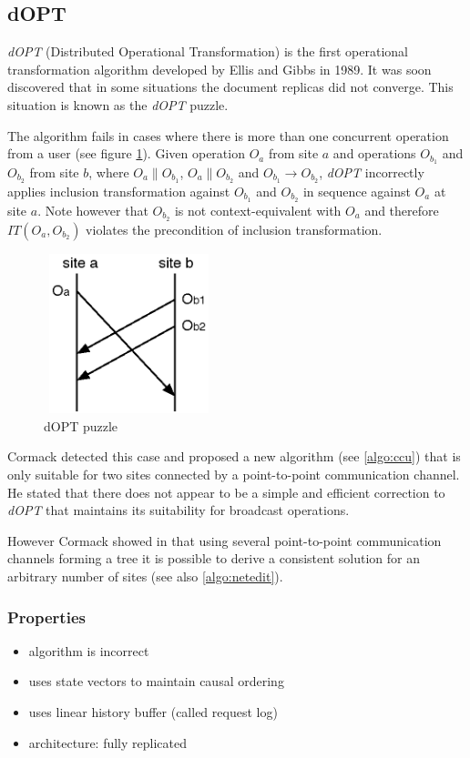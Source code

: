 \subsection{dOPT}
\label{algo:dopt}

\emph{dOPT} (Distributed Operational Transformation) is the first operational transformation algorithm developed by {Ellis and Gibbs}\cite{ellis} in 1989. It was soon discovered that in some situations the document replicas did not converge. This situation is known as the \emph{dOPT} puzzle.

The algorithm fails in cases where there is more than one concurrent operation from a user (see figure \ref{fig:doptpuzzle}). Given operation $O_{a}$ from site $a$ and operations $O_{b_{1}}$ and $O_{b_{2}}$ from site $b$, where $O_{a} \parallel O_{b_{1}}$, $O_{a} \parallel O_{b_{2}}$ and $O_{b_{1}} \rightarrow O_{b_{2}}$, \emph{dOPT} incorrectly applies inclusion transformation against $O_{b_{1}}$ and $O_{b_{2}}$ in sequence against $O_{a}$ at site $a$. Note however that $O_{b_{2}}$ is not context-equivalent with $O_{a}$ and therefore $IT(O_{a},O_{b_{2}})$ violates the precondition of inclusion transformation.

\begin{figure}[H]
 \centering
 \includegraphics[width=1.94in,height=1.83in]{../../images/dopt_puzzle.eps}
 \caption{dOPT puzzle}
 \label{fig:doptpuzzle}
\end{figure}

Cormack\cite{cormack95a} detected this case and proposed a new algorithm (see \ref{algo:ccu}) that is only suitable for two sites connected by a point-to-point communication channel. He stated that there does not appear to be a simple and efficient correction to \emph{dOPT} that maintains its suitability for broadcast operations.

However Cormack showed in \cite{cormack95b} that using several point-to-point communication channels forming a tree it is possible to derive a consistent solution for an arbitrary number of sites (see also \ref{algo:netedit}).

\subsubsection{Properties}
\begin{itemize}
 \item algorithm is incorrect
 \item uses state vectors to maintain causal ordering
 \item uses linear history buffer (called request log)
 \item architecture: fully replicated
\end{itemize}
